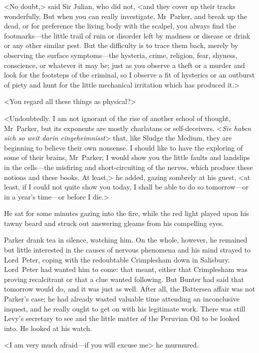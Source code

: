 <No doubt,> said Sir Julian, who did not, <and they cover up their tracks wonderfully. But when you can really investigate, Mr~Parker, and break up the dead, or for preference the living body with the scalpel, you always find the footmarks—the little trail of ruin or disorder left by madness or disease or drink or any other similar pest. But the difficulty is to trace them back, merely by observing the surface symptoms—the hysteria, crime, religion, fear, shyness, conscience, or whatever it may be; just as you observe a theft or a murder and look for the footsteps of the criminal, so I observe a fit of hysterics or an outburst of piety and hunt for the little mechanical irritation which has produced it.>

<You regard all these things as physical?>

<Undoubtedly. I am not ignorant of the rise of another school of thought, Mr~Parker, but its exponents are mostly charlatans or self-deceivers. <\textit{Sie haben sich so weit darin eingeheimnisst}> that, like Sludge the Medium, they are beginning to believe their own nonsense. I should like to have the exploring of some of their brains, Mr~Parker; I would show you the little faults and landslips in the cells—the misfiring and short-circuiting of the nerves, which produce these notions and these books. At least,> he added, gazing sombrely at his guest, <at least, if I could not quite show you today, I shall be able to do so tomorrow—or in a year's time—or before I die.>

He sat for some minutes gazing into the fire, while the red light played upon his tawny beard and struck out answering gleams from his compelling eyes.

Parker drank tea in silence, watching him. On the whole, however, he remained but little interested in the causes of nervous phenomena and his mind strayed to Lord~Peter, coping with the redoubtable Crimplesham down in Salisbury. Lord~Peter had wanted him to come: that meant, either that Crimplesham was proving recalcitrant or that a clue wanted following. But Bunter had said that tomorrow would do, and it was just as well. After all, the Battersea affair was not Parker's case; he had already wasted valuable time attending an inconclusive inquest, and he really ought to get on with his legitimate work. There was still Levy's secretary to see and the little matter of the Peruvian Oil to be looked into. He looked at his watch.

<I am very much afraid—if you will excuse me\longdash> he murmured.


